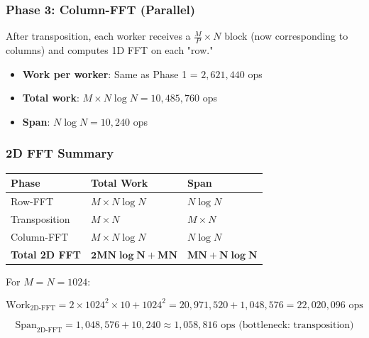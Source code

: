\documentclass[11pt,a4paper]{article}
\theoremstyle{definition}
\begin{document}
\subsubsection{Phase 3: Column-FFT (Parallel)}

After transposition, each worker receives a $\frac{M}{P} \times N$ block (now corresponding to columns) and computes 1D FFT on each "row."

\begin{itemize}
    \item \textbf{Work per worker}: Same as Phase 1 = $2{,}621{,}440$ ops
    \item \textbf{Total work}: $M \times N \log N = 10{,}485{,}760$ ops
    \item \textbf{Span}: $N \log N = 10{,}240$ ops
\end{itemize}

\subsubsection{2D FFT Summary}

\begin{table}[h]
    \centering
    \begin{tabular}{lll}
        \hline
        \textbf{Phase} & \textbf{Total Work} & \textbf{Span} \\
        \hline
        Row-FFT & $M \times N \log N$ & $N \log N$ \\
        Transposition & $M \times N$ & $M \times N$ \\
        Column-FFT & $M \times N \log N$ & $N \log N$ \\
        \hline
        \textbf{Total 2D FFT} & $\mathbf{2MN \log N + MN}$ & $\mathbf{MN + N\log N}$ \\
        \hline
    \end{tabular}
\end{table}

For $M = N = 1024$:

\begin{equation}
\text{Work}_{\text{2D-FFT}} = 2 \times 1024^2 \times 10 + 1024^2 = 20{,}971{,}520 + 1{,}048{,}576 = 22{,}020{,}096 \text{ ops}
\end{equation}

\begin{equation}
\text{Span}_{\text{2D-FFT}} = 1{,}048{,}576 + 10{,}240 \approx 1{,}058{,}816 \text{ ops (bottleneck: transposition)}
\end{equation}
\end{document}
